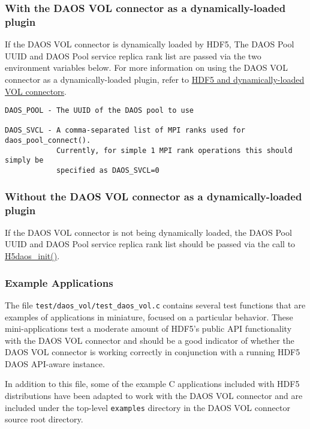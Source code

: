 
\subsubsection{With the DAOS VOL connector as a dynamically-loaded plugin}

If the DAOS VOL connector is dynamically loaded by HDF5, The DAOS Pool UUID and DAOS Pool service replica rank list are passed via the two environment variables below. For more information on using the DAOS VOL connector as a dynamically-loaded plugin, refer to \hyperref[hdf5:dynamically_loaded_connectors]{HDF5 and dynamically-loaded VOL connectors}.

\begin{verbatim}
DAOS_POOL - The UUID of the DAOS pool to use

DAOS_SVCL - A comma-separated list of MPI ranks used for daos_pool_connect().
            Currently, for simple 1 MPI rank operations this should simply be
            specified as DAOS_SVCL=0
\end{verbatim}

\subsubsection{Without the DAOS VOL connector as a dynamically-loaded plugin}

If the DAOS VOL connector is not being dynamically loaded, the DAOS Pool UUID and DAOS Pool service replica rank list should be passed via the call to \hyperref[ref:h5daos_init]{H5daos\_init()}.

\subsubsection{Example Applications}

The file \texttt{test/daos\_vol/test\_daos\_vol.c} contains several test functions that are examples of applications in miniature, focused on a particular behavior. These mini-applications test a moderate amount of HDF5's public API functionality with the DAOS VOL connector and should be a good indicator of whether the DAOS VOL connector is working correctly in conjunction with a running HDF5 DAOS API-aware instance.

In addition to this file, some of the example C applications included with HDF5 distributions have been adapted to work with the DAOS VOL connector and are included under the top-level \texttt{examples} directory in the DAOS VOL connector source root directory.


